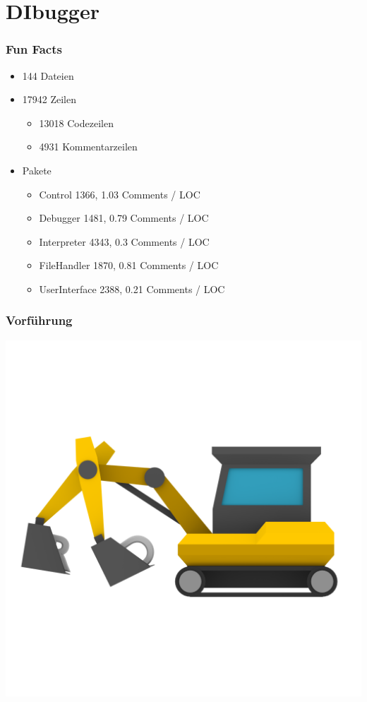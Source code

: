 \documentclass{beamer}
\begin{document}
\section{DIbugger}
\begin{frame}
\frametitle{Fun Facts}
\begin{itemize}
\item 144 Dateien
\item 17942 Zeilen
\begin{itemize}
\item 13018 Codezeilen
\item 4931 Kommentarzeilen
\end{itemize}
\item Pakete
\begin{itemize}
\item Control 1366, 1.03 Comments / LOC
\item Debugger 1481, 0.79 Comments / LOC
\item Interpreter 4343, 0.3 Comments / LOC
\item FileHandler 1870, 0.81 Comments / LOC
\item UserInterface 2388, 0.21 Comments / LOC
\end{itemize}
\end{itemize}
\end{frame}

\begin{frame}
\frametitle{Vorführung}
\begin{center}
\includegraphics[scale=0.2]{../DIbugger/res/ui/logo_nongi.png}
\end{center}
\end{frame}
\end{document}
